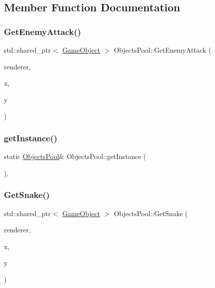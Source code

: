 \subsection{Member Function Documentation}
\mbox{\label{class_objects_pool_a0cb6ec80efacce659b008ab8bc000aa9}} 
\subsubsection{\texorpdfstring{Get\+Enemy\+Attack()}{GetEnemyAttack()}}
{\footnotesize\ttfamily std\+::shared\+\_\+ptr$<$ \mbox{\hyperlink{class_game_object}{Game\+Object}} $>$ Objects\+Pool\+::\+Get\+Enemy\+Attack (\begin{DoxyParamCaption}\item[{S\+D\+L\+\_\+\+Renderer $\ast$}]{renderer,  }\item[{int}]{x,  }\item[{int}]{y }\end{DoxyParamCaption})}

\mbox{\label{class_objects_pool_aca7dadcb65812523bc0f910cf8183884}} 
\subsubsection{\texorpdfstring{get\+Instance()}{getInstance()}}
{\footnotesize\ttfamily static \mbox{\hyperlink{class_objects_pool}{Objects\+Pool}}\& Objects\+Pool\+::get\+Instance (\begin{DoxyParamCaption}{ }\end{DoxyParamCaption})\hspace{0.3cm}{\ttfamily [inline]}, {\ttfamily [static]}}

\mbox{\label{class_objects_pool_a97601dd9984711e20f2f9984a51a1741}} 
\subsubsection{\texorpdfstring{Get\+Snake()}{GetSnake()}}
{\footnotesize\ttfamily std\+::shared\+\_\+ptr$<$ \mbox{\hyperlink{class_game_object}{Game\+Object}} $>$ Objects\+Pool\+::\+Get\+Snake (\begin{DoxyParamCaption}\item[{S\+D\+L\+\_\+\+Renderer $\ast$}]{renderer,  }\item[{int}]{x,  }\item[{int}]{y }\end{DoxyParamCaption})}



